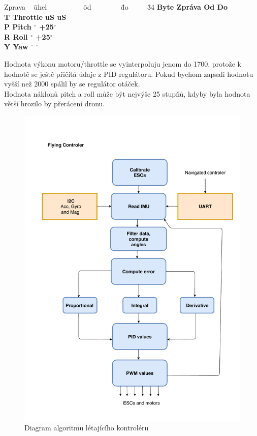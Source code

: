 \begin{tabbing}
	Zprava ~ \= uhel ~~~~~~~~~ \= od ~~~~~~~ \= do ~~~~
	\= 34 \kill
	\bfseries Byte \>
	\bfseries Zpráva \>
	\bfseries Od \>
	\bfseries Do \\
	T\> Throttle  uS  uS \\
	P\> Pitch $^\circ$ \> +25$^\circ$   \\
	R\> Roll $^\circ$ \> +25$^\circ$ \\
	Y\> Yaw $^\circ$ $^\circ$ \\
\end{tabbing}

Hodnota výkonu motoru/throttle se vyinterpoluju jenom do 1700, protože k hodnotě se ještě přičítá údaje z PID regulátoru. Pokud bychom zapsali hodnotu vyšší než 2000 spálil by se regulátor otáček.\\
Hodnota náklonů pitch a roll  může být nejvýše 25 stupňů, kdyby byla hodnota větší hrozilo by přerácení dronu.\\

\begin{figure}[h]
	\centering
	\includegraphics[width=15cm]{pictures/FlyingDiagram.pdf}
	\caption{Diagram algoritmu létajícího kontroléru}
\end{figure}


